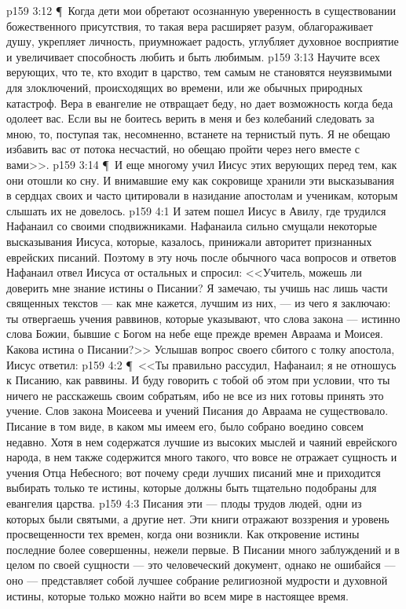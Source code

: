 \vs p159 3:12 \P\ Когда дети мои обретают осознанную уверенность в существовании божественного присутствия, то такая вера расширяет разум, облагораживает душу, укрепляет личность, приумножает радость, углубляет духовное восприятие и увеличивает способность любить и быть любимым.
\vs p159 3:13 Научите всех верующих, что те, кто входит в царство, тем самым не становятся неуязвимыми для злоключений, происходящих во времени, или же обычных природных катастроф. Вера в евангелие не отвращает беду, но дает возможность  когда беда одолеет вас. Если вы не боитесь верить в меня и без колебаний следовать за мною, то, поступая так, несомненно, встанете на тернистый путь. Я не обещаю избавить вас от потока несчастий, но обещаю пройти через него вместе с вами>>.
\vs p159 3:14 \P\ И еще многому учил Иисус этих верующих перед тем, как они отошли ко сну. И внимавшие ему как сокровище хранили эти высказывания в сердцах своих и часто цитировали в назидание апостолам и ученикам, которым слышать их не довелось.
\vs p159 4:1 И затем пошел Иисус в Авилу, где трудился Нафанаил со своими сподвижниками. Нафанаила сильно смущали некоторые высказывания Иисуса, которые, казалось, принижали авторитет признанных еврейских писаний. Поэтому в эту ночь после обычного часа вопросов и ответов Нафанаил отвел Иисуса от остальных и спросил: <<Учитель, можешь ли доверить мне знание истины о Писании? Я замечаю, ты учишь нас лишь части священных текстов --- как мне кажется, лучшим из них, --- из чего я заключаю: ты отвергаешь учения раввинов, которые указывают, что слова закона --- истинно слова Божии, бывшие с Богом на небе еще прежде времен Авраама и Моисея. Какова истина о Писании?>> Услышав вопрос своего сбитого с толку апостола, Иисус ответил:
\vs p159 4:2 \P\ <<Ты правильно рассудил, Нафанаил; я не отношусь к Писанию, как раввины. И буду говорить с тобой об этом при условии, что ты ничего не расскажешь своим собратьям, ибо не все из них готовы принять это учение. Слов закона Моисеева и учений Писания до Авраама не существовало. Писание в том виде, в каком мы имеем его, было собрано воедино совсем недавно. Хотя в нем содержатся лучшие из высоких мыслей и чаяний еврейского народа, в нем также содержится много такого, что вовсе не отражает сущность и учения Отца Небесного; вот почему среди лучших писаний мне и приходится выбирать только те истины, которые должны быть тщательно подобраны для евангелия царства.
\vs p159 4:3 Писания эти --- плоды трудов людей, одни из которых были святыми, а другие нет. Эти книги отражают воззрения и уровень просвещенности тех времен, когда они возникли. Как откровение истины последние более совершенны, нежели первые. В Писании много заблуждений и в целом по своей сущности --- это человеческий документ, однако не ошибайся --- оно --- представляет собой лучшее собрание религиозной мудрости и духовной истины, которые только можно найти во всем мире в настоящее время.
